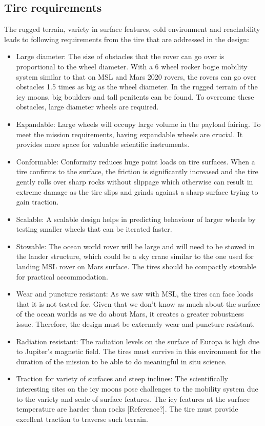 \documentclass{article}
\begin{document}
\subsection{Tire requirements}
The rugged terrain, variety in surface features, cold environment and reachability leads to following requirements from the tire that are addressed in the design:
\begin{itemize}
    \item Large diameter: The size of obstacles that the rover can go over is proportional to the wheel diameter. With a 6 wheel rocker bogie mobility system similar to that on MSL and Mars 2020 rovers, the rovers can go over obstacles 1.5 times as big as the wheel diameter. In the rugged terrain of the icy moons, big boulders and tall penitents can be found. To overcome these obstacles, large diameter wheels are required.
    \item Expandable: Large wheels will occupy large volume in the payload fairing. To meet the mission requirements, having expandable wheels are crucial. It provides more space for valuable scientific instruments. 
    \item Conformable: Conformity reduces huge point loads on tire surfaces. When a tire confirms to the surface, the friction is significantly increased and the tire gently rolls over sharp rocks without slippage which otherwise can result in extreme damage as the tire slips and grinds against a sharp surface trying to gain traction.      
    \item Scalable: A scalable design helps in predicting behaviour of larger wheels by testing smaller wheels that can be iterated faster.
    \item Stowable: The ocean world rover will be large and will need to be stowed in the lander structure, which could be a sky crane similar to the one used for landing MSL rover on Mars surface. The tires should be compactly stowable for practical accommodation. 
    \item Wear and puncture resistant: As we saw with MSL, the tires can face loads that it is not tested for. Given that we don't know as much about the surface of the ocean worlds as we do about Mars, it creates a greater robustness issue. Therefore, the design must be extremely wear and puncture resistant. 
    \item Radiation resistant: The radiation levels on the surface of Europa is high due to Jupiter's magnetic field. The tires must survive in this environment for the duration of the mission to be able to do meaningful in situ science. 
    \item Traction for variety of surfaces and steep inclines: The scientifically interesting sites on the icy moons pose challenges to the mobility system due to the variety and scale of surface features. The icy features at the surface temperature are harder than rocks [Reference?]. The tire must provide excellent traction to traverse such terrain.  
    
\end{itemize}
\end{document}

